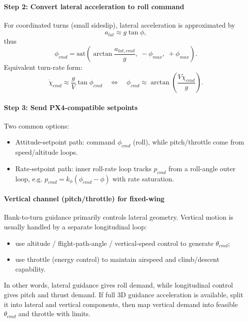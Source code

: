 \documentclass[11pt,a4paper]{article}
\begin{document}
\paragraph{Step 2: Convert lateral acceleration to roll command}
For coordinated turns (small sideslip), lateral acceleration is approximated by
\begin{equation}
a_{lat} \approx g \tan\phi,
\end{equation}
thus
\begin{equation}
\phi_{cmd} = \mathrm{sat}\!\left(\arctan\!\frac{a_{lat,cmd}}{g},\;-\phi_{max},\;+\phi_{max}\right).
\end{equation}
Equivalent turn-rate form:
\begin{equation}
\dot{\chi}_{cmd} \approx \frac{g}{V}\tan\phi_{cmd}
\quad\Longleftrightarrow\quad
\phi_{cmd}\approx\arctan\!\left(\frac{V\dot{\chi}_{cmd}}{g}\right).
\end{equation}

\paragraph{Step 3: Send PX4-compatible setpoints}
Two common options:
\begin{itemize}
    \item Attitude-setpoint path: command $\phi_{cmd}$ (roll), while pitch/throttle come from speed/altitude loops.
    \item Rate-setpoint path: inner roll-rate loop tracks $p_{cmd}$ from a roll-angle outer loop, e.g. $p_{cmd}=k_{\phi}(\phi_{cmd}-\phi)$ with rate saturation.
\end{itemize}

\paragraph{Vertical channel (pitch/throttle) for fixed-wing}
Bank-to-turn guidance primarily controls lateral geometry. Vertical motion is usually handled by a separate longitudinal loop:
\begin{itemize}
    \item use altitude / flight-path-angle / vertical-speed control to generate $\theta_{cmd}$;
    \item use throttle (energy control) to maintain airspeed and climb/descent capability.
\end{itemize}
In other words, lateral guidance gives roll demand, while longitudinal control gives pitch and thrust demand. If full 3D guidance acceleration is available, split it into lateral and vertical components, then map vertical demand into feasible $\theta_{cmd}$ and throttle with limits.
\end{document}
